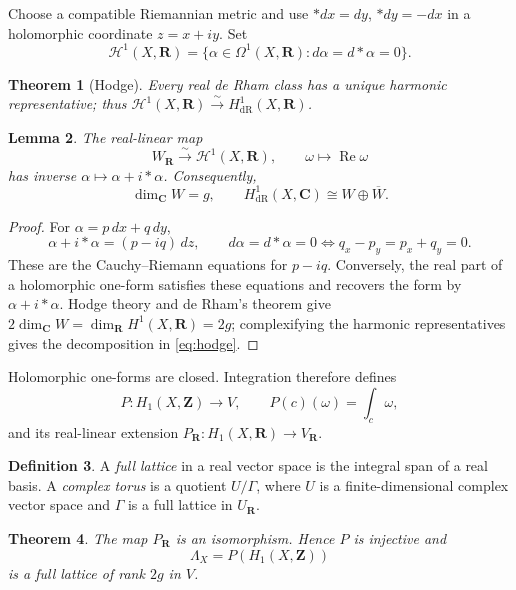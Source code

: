 \documentclass[11pt]{article}
\numberwithin{equation}{section}
\newtheorem{theorem}{Theorem}[section]
\newtheorem{lemma}[theorem]{Lemma}
\theoremstyle{definition}
\newtheorem{definition}[theorem]{Definition}
\newcommand{\Z}{\mathbf Z}
\newcommand{\R}{\mathbf R}
\newcommand{\C}{\mathbf C}
\newcommand{\dR}{\mathrm{dR}}
\newcommand{\HH}{\mathcal H}
\begin{document}
Choose a compatible Riemannian metric and use
$*dx=dy$, $*dy=-dx$ in a holomorphic coordinate $z=x+iy$. Set
\[
 \HH^1(X,\R)=\{\alpha\in\Omega^1(X,\R):d\alpha=d*\alpha=0\}.
\]

\begin{theorem}[Hodge]
Every real de Rham class has a unique harmonic representative; thus
$\HH^1(X,\R)\xrightarrow{\sim}H^1_{\dR}(X,\R)$.
\end{theorem}

\begin{lemma}\label{lem:realparts}
The real-linear map
\[
 W_{\R}\xrightarrow{\sim}\HH^1(X,\R),\qquad
 \omega\longmapsto\operatorname{Re}\omega
\]
has inverse $\alpha\mapsto\alpha+i*\alpha$. Consequently,
\begin{equation}\label{eq:hodge}
 \dim_{\C}W=g,\qquad
 H^1_{\dR}(X,\C)\cong W\oplus\overline W.
\end{equation}
\end{lemma}

\begin{proof}
For $\alpha=p\,dx+q\,dy$,
\[
 \alpha+i*\alpha=(p-iq)\,dz,
 \qquad d\alpha=d*\alpha=0
 \iff q_x-p_y=p_x+q_y=0.
\]
These are the Cauchy--Riemann equations for $p-iq$. Conversely, the real
part of a holomorphic one-form satisfies these equations and recovers
the form by $\alpha+i*\alpha$. Hodge theory and de Rham's theorem give
$2\dim_{\C}W=\dim_{\R}H^1(X,\R)=2g$; complexifying the harmonic
representatives gives the decomposition in \eqref{eq:hodge}.
\end{proof}

Holomorphic one-forms are closed. Integration therefore defines
\begin{equation}\label{eq:period}
 P:H_1(X,\Z)\longrightarrow V,\qquad
 P(c)(\omega)=\int_c\omega,
\end{equation}
and its real-linear extension
$P_{\R}:H_1(X,\R)\to V_{\R}$.

\begin{definition}
A \emph{full lattice} in a real vector space is the integral span of a
real basis. A \emph{complex torus} is a quotient $U/\Gamma$, where $U$
is a finite-dimensional complex vector space and $\Gamma$ is a full
lattice in $U_{\R}$.
\end{definition}

\begin{theorem}\label{thm:lattice}
The map $P_{\R}$ is an isomorphism. Hence $P$ is injective and
\[
 \Lambda_X=P(H_1(X,\Z))
\]
is a full lattice of rank $2g$ in $V$.
\end{theorem}
\end{document}
